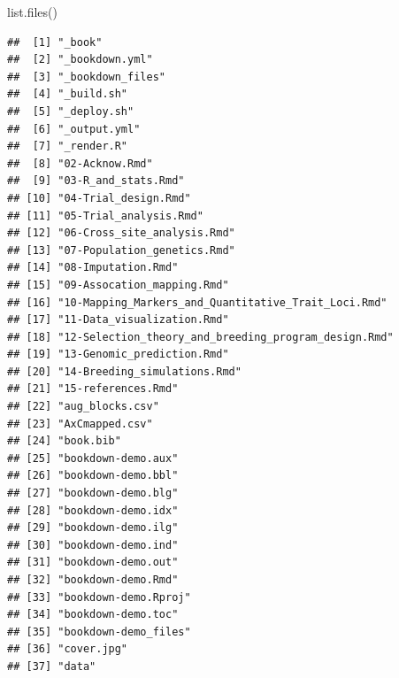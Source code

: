 \documentclass[
]{book}
\newenvironment{Shaded}{\begin{snugshade}}{\end{snugshade}}
\newcommand{\FunctionTok}[1]{\textcolor[rgb]{0.00,0.00,0.00}{#1}}
\newcommand{\NormalTok}[1]{#1}
\begin{document}
\begin{Shaded}
\begin{Highlighting}[]
\FunctionTok{list.files}\NormalTok{()}
\end{Highlighting}
\end{Shaded}

\begin{verbatim}
##  [1] "_book"                                              
##  [2] "_bookdown.yml"                                      
##  [3] "_bookdown_files"                                    
##  [4] "_build.sh"                                          
##  [5] "_deploy.sh"                                         
##  [6] "_output.yml"                                        
##  [7] "_render.R"                                          
##  [8] "02-Acknow.Rmd"                                      
##  [9] "03-R_and_stats.Rmd"                                 
## [10] "04-Trial_design.Rmd"                                
## [11] "05-Trial_analysis.Rmd"                              
## [12] "06-Cross_site_analysis.Rmd"                         
## [13] "07-Population_genetics.Rmd"                         
## [14] "08-Imputation.Rmd"                                  
## [15] "09-Assocation_mapping.Rmd"                          
## [16] "10-Mapping_Markers_and_Quantitative_Trait_Loci.Rmd" 
## [17] "11-Data_visualization.Rmd"                          
## [18] "12-Selection_theory_and_breeding_program_design.Rmd"
## [19] "13-Genomic_prediction.Rmd"                          
## [20] "14-Breeding_simulations.Rmd"                        
## [21] "15-references.Rmd"                                  
## [22] "aug_blocks.csv"                                     
## [23] "AxCmapped.csv"                                      
## [24] "book.bib"                                           
## [25] "bookdown-demo.aux"                                  
## [26] "bookdown-demo.bbl"                                  
## [27] "bookdown-demo.blg"                                  
## [28] "bookdown-demo.idx"                                  
## [29] "bookdown-demo.ilg"                                  
## [30] "bookdown-demo.ind"                                  
## [31] "bookdown-demo.out"                                  
## [32] "bookdown-demo.Rmd"                                  
## [33] "bookdown-demo.Rproj"                                
## [34] "bookdown-demo.toc"                                  
## [35] "bookdown-demo_files"                                
## [36] "cover.jpg"                                          
## [37] "data"                                               

\end{verbatim}
\end{document}
